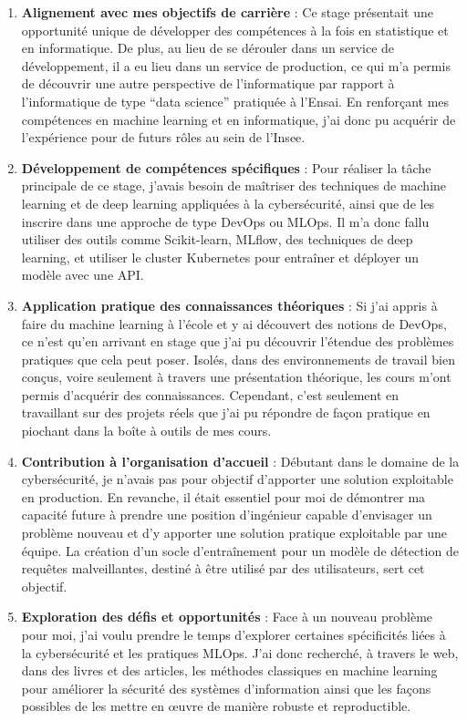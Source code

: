 \documentclass[
  letterpaper,
  DIV=11,
  numbers=noendperiod]{scrartcl}
\begin{document}
\begin{enumerate}
\def\labelenumi{\arabic{enumi}.}
\item
  \textbf{Alignement avec mes objectifs de carrière} : Ce stage
  présentait une opportunité unique de développer des compétences à la
  fois en statistique et en informatique. De plus, au lieu de se
  dérouler dans un service de développement, il a eu lieu dans un
  service de production, ce qui m'a permis de découvrir une autre
  perspective de l'informatique par rapport à l'informatique de type
  ``data science'' pratiquée à l'Ensai. En renforçant mes compétences en
  machine learning et en informatique, j'ai donc pu acquérir de
  l'expérience pour de futurs rôles au sein de l'Insee.
\item
  \textbf{Développement de compétences spécifiques} : Pour réaliser la
  tâche principale de ce stage, j'avais besoin de maîtriser des
  techniques de machine learning et de deep learning appliquées à la
  cybersécurité, ainsi que de les inscrire dans une approche de type
  DevOps ou MLOps. Il m'a donc fallu utiliser des outils comme
  Scikit-learn, MLflow, des techniques de deep learning, et utiliser le
  cluster Kubernetes pour entraîner et déployer un modèle avec une API.
\item
  \textbf{Application pratique des connaissances théoriques} : Si j'ai
  appris à faire du machine learning à l'école et y ai découvert des
  notions de DevOps, ce n'est qu'en arrivant en stage que j'ai pu
  découvrir l'étendue des problèmes pratiques que cela peut poser.
  Isolés, dans des environnements de travail bien conçus, voire
  seulement à travers une présentation théorique, les cours m'ont permis
  d'acquérir des connaissances. Cependant, c'est seulement en
  travaillant sur des projets réels que j'ai pu répondre de façon
  pratique en piochant dans la boîte à outils de mes cours.
\item
  \textbf{Contribution à l'organisation d'accueil} : Débutant dans le
  domaine de la cybersécurité, je n'avais pas pour objectif d'apporter
  une solution exploitable en production. En revanche, il était
  essentiel pour moi de démontrer ma capacité future à prendre une
  position d'ingénieur capable d'envisager un problème nouveau et d'y
  apporter une solution pratique exploitable par une équipe. La création
  d'un socle d'entraînement pour un modèle de détection de requêtes
  malveillantes, destiné à être utilisé par des utilisateurs, sert cet
  objectif.
\item
  \textbf{Exploration des défis et opportunités} : Face à un nouveau
  problème pour moi, j'ai voulu prendre le temps d'explorer certaines
  spécificités liées à la cybersécurité et les pratiques MLOps. J'ai
  donc recherché, à travers le web, dans des livres et des articles, les
  méthodes classiques en machine learning pour améliorer la sécurité des
  systèmes d'information ainsi que les façons possibles de les mettre en
  œuvre de manière robuste et reproductible.
\end{enumerate}
\end{document}
